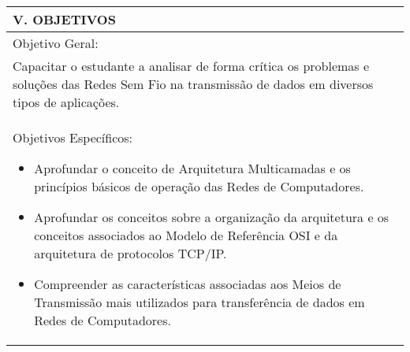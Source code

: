 \documentclass[12pt]{article}
\begin{document}
\begin{longtable}{|L{1.025\textwidth}|} \hline
%
{\bf V. OBJETIVOS } \\ \hline
Objetivo Geral:\\

Capacitar o estudante a analisar de forma crítica os problemas e soluções das Redes Sem Fio na transmissão de dados em diversos tipos de aplicações. 
\\
Objetivos Específicos:

\begin{itemize}
\item Aprofundar o conceito de Arquitetura Multicamadas e os princípios básicos de operação das Redes de Computadores.
\item  Aprofundar os conceitos sobre a organização da arquitetura e os conceitos associados ao Modelo de Referência OSI e da arquitetura de protocolos TCP/IP. 
\item  Compreender as características associadas aos Meios de Transmissão mais utilizados para transferência de dados em Redes de Computadores.
\end{itemize}
\\ \hline
\end{longtable}
\end{document}
